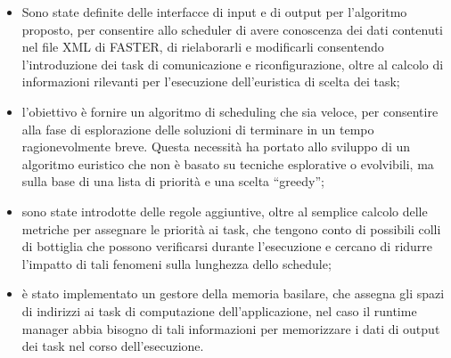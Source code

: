 \begin{itemize}
  \item Sono state definite delle interfacce di input e di output per 
l'algoritmo proposto, per consentire allo scheduler di avere conoscenza dei 
dati contenuti nel file XML di \ac{FASTER}, di rielaborarli e modificarli 
consentendo l'introduzione dei task di comunicazione e riconfigurazione, oltre 
al calcolo di informazioni rilevanti per l'esecuzione dell'euristica di scelta dei task;
 \item l'obiettivo è fornire un algoritmo di scheduling che sia veloce, per 
consentire alla fase di esplorazione delle soluzioni di terminare in un tempo 
ragionevolmente breve. Questa necessità ha portato allo sviluppo di un algoritmo euristico
che non è basato su tecniche esplorative o evolvibili, ma sulla base di una 
lista di priorità e una scelta ``greedy'';
 \item sono state introdotte delle regole aggiuntive, oltre al semplice calcolo 
delle metriche per assegnare le priorità ai task, che tengono conto di 
possibili colli di bottiglia che possono verificarsi durante l'esecuzione e 
cercano di ridurre l'impatto di tali fenomeni sulla lunghezza dello schedule;
 \item è stato implementato un gestore della memoria basilare, che assegna gli spazi di
 indirizzi ai task di computazione dell'applicazione, nel caso il runtime manager abbia
 bisogno di tali informazioni per memorizzare i dati di output dei task nel corso
 dell'esecuzione.
\end{itemize}
